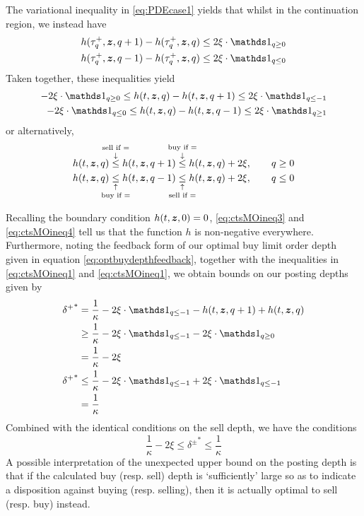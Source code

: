 The variational inequality in \eqref{eq:PDEcase1} yields that whilst in the continuation region, we instead have
\begin{align}
h(\tau^+_q, \bz, q+1) - h(\tau^+_q,\bz,q) & \leq 2 \xi \cdot \indicator_{q \geq 0} \\
h(\tau^+_q, \bz, q-1) - h(\tau^+_q,\bz,q) & \leq 2 \xi \cdot \indicator_{q \leq 0}
\end{align}
Taken together, these inequalities yield
\begin{align}
-2\xi \cdot \indicator_{q \geq 0} \leq h(t,\bz,q) - h(t,\bz,q+1) \leq 2\xi \cdot \indicator_{q \leq -1} \label{eq:ctsMOineq1}\\
-2\xi \cdot \indicator_{q \leq 0} \leq h(t,\bz,q) - h(t,\bz,q-1) \leq 2\xi \cdot \indicator_{q \geq 1} \label{eq:ctsMOineq2}
\end{align}
or alternatively,
\begin{align}
h(t,\bz,q) \overset{\text{\makebox[0pt]{sell if =}}}{\overset{\downarrow}{\leq}} h(t,\bz,q+1) \overset{\text{\makebox[0pt]{buy if =}}}{\overset{\downarrow}{\leq}} h(t,\bz,q) + 2\xi, \qquad q \geq 0 \label{eq:ctsMOineq3}\\
h(t,\bz,q) \underset{\text{\makebox[0pt]{buy if =}}}{\underset{\uparrow}{\leq}} h(t,\bz,q-1) \underset{\text{\makebox[0pt]{sell if =}}}{\underset{\uparrow}{\leq}} h(t,\bz,q) + 2\xi, \qquad q \leq 0 \label{eq:ctsMOineq4}
\end{align}

Recalling the boundary condition $h(t,\bm{z},0) = 0$, \eqref{eq:ctsMOineq3} and \eqref{eq:ctsMOineq4} tell us that the function $h$ is non-negative everywhere. Furthermore, noting the feedback form of our optimal buy limit order depth given in equation \eqref{eq:optbuydepthfeedback}, together with the inequalities in \eqref{eq:ctsMOineq1} and \eqref{eq:ctsMOineq1}, we obtain bounds on our posting depths given by
\begin{align}
{\delta^+}^* & = \frac{1}{\kappa} - 2 \xi \cdot \indicator_{q \leq -1} - h(t,\bz,q+1) + h(t,\bz,q) \\
& \geq \frac{1}{\kappa} - 2 \xi \cdot \indicator_{q \leq -1} - 2 \xi \cdot \indicator_{q \geq 0} \\
& = \frac{1}{\kappa} - 2\xi \\
{\delta^+}^* & \leq \frac{1}{\kappa} - 2 \xi \cdot \indicator_{q \leq -1} + 2 \xi \cdot \indicator_{q \leq -1} \\
& = \frac{1}{\kappa}
\end{align}
Combined with the identical conditions on the sell depth, we have the conditions
\begin{equation}\label{eq:deltaslowerboundcase1}
\boxed{ \frac{1}{\kappa} - 2\xi  \leq {\delta^\pm}^* \leq \frac{1}{\kappa} }
\end{equation}
A possible interpretation of the unexpected upper bound on the posting depth is that if the calculated buy (resp. sell) depth is `sufficiently' large so as to indicate a disposition against buying (resp. selling), then it is actually optimal to sell (resp. buy) instead.

